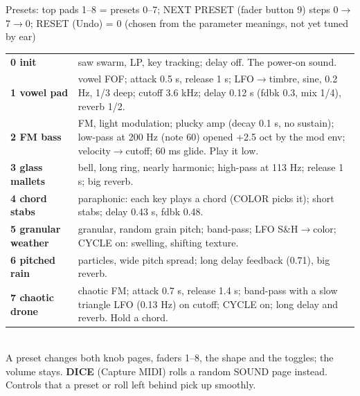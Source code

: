 \documentclass{article}
\begin{document}
\begin{minipage}[t]{166mm}
\begin{card}{Presets: top pads 1--8 = presets 0--7; NEXT PRESET (fader button 9) steps 0\(\to\)7\(\to\)0; RESET (Undo) = 0 \quad\textmd{\fontsize{6.5}{7}\selectfont (chosen from the parameter meanings, not yet tuned by ear)}}
\fontsize{7.2}{8.7}\selectfont
\begin{tabularx}{\linewidth}{@{}>{\bfseries}l L@{}}
0 init & saw swarm, LP, key tracking; delay off. The power-on sound. \\
1 vowel pad & vowel FOF; attack 0.5 s, release 1 s; LFO\(\to\)timbre, sine, 0.2 Hz, 1/3 deep; cutoff 3.6 kHz;
delay 0.12 s (fdbk 0.3, mix 1/4), reverb 1/2. \\
2 FM bass & FM, light modulation; plucky amp (decay 0.1 s, no sustain); low-pass at 200 Hz (note 60) opened
+2.5 oct by the mod env; velocity\(\to\)cutoff; 60 ms glide. Play it low. \\
3 glass mallets & bell, long ring, nearly harmonic; high-pass at 113 Hz; release 1 s; big reverb. \\
4 chord stabs & paraphonic: each key plays a chord (COLOR picks it); short stabs; delay 0.43 s, fdbk 0.48. \\
5 granular weather & granular, random grain pitch; band-pass; LFO S\&H\(\to\)color; CYCLE on: swelling, shifting texture. \\
6 pitched rain & particles, wide pitch spread; long delay feedback (0.71), big reverb. \\
7 chaotic drone & chaotic FM; attack 0.7 s, release 1.4 s; band-pass with a slow triangle LFO (0.13 Hz) on cutoff;
CYCLE on; long delay and reverb. Hold a chord. \\
\end{tabularx}\\[0.3mm]
A preset changes both knob pages, faders 1--8, the shape and the toggles; the volume stays. \textbf{DICE}
(Capture MIDI) rolls a random SOUND page instead. Controls that a preset or roll left behind pick up smoothly.
\end{card}
\end{minipage}\hfill
\end{document}
